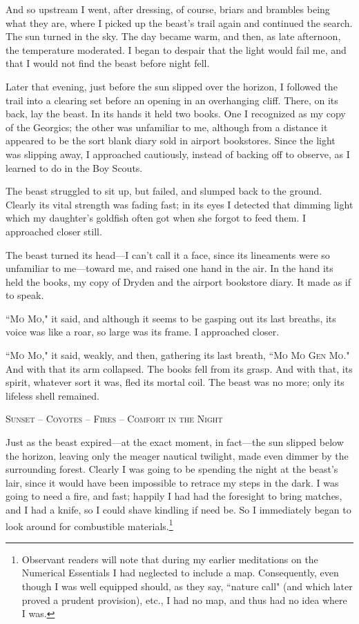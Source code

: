 \par
And so upstream I went, after dressing, of course, briars and brambles being what they are, where I picked up the beast's trail again and continued the search.  The sun turned in the sky.  The day became warm, and then, as late afternoon, the temperature moderated.  I began to despair that the light would fail me, and that I would not find the beast before night fell.
\par
Later that evening, just before the sun slipped over the horizon, I followed the trail into a clearing set before an opening in an overhanging cliff.  There, on its back, lay the beast.  In its hands it held two books.  One I recognized as my copy of the Georgics; the other was unfamiliar to me, although from a distance it appeared to be the sort blank diary sold in airport bookstores.  Since the light was slipping away, I approached cautiously, instead of backing off to observe, as I learned to do in the Boy Scouts.
\par
The beast struggled to sit up, but failed, and slumped back to the ground.  Clearly its vital strength was fading fast; in its eyes I detected that dimming light which my daughter's goldfish often got when she forgot to feed them.  I approached closer still.
\par
The beast turned its head—I can't call it a face, since its lineaments were so unfamiliar to me—toward me, and raised one hand in the air.  In the hand its held the books, my copy of Dryden and the airport bookstore diary.  It made as if to speak.
\par
``\textsc{Mo Mo}," it said, and although it seems to be gasping out its last breaths, its voice was like a roar, so large was its frame.  I approached closer.
\par
``\textsc{Mo Mo}," it said, weakly, and then, gathering its last breath, ``\textsc{Mo Mo Gen Mo}."  And with that its arm collapsed.  The books fell from its grasp.  And with that, its spirit, whatever sort it was, fled its mortal coil.  The beast was no more; only its lifeless shell remained.
\par
\begin{center}
\textsc{Sunset – Coyotes – Fires – Comfort in the Night}
\end{center}
\par
Just as the beast expired—at the exact moment, in fact—the sun slipped below the horizon, leaving only the meager nautical twilight, made even dimmer by the surrounding forest.  Clearly I was going to be spending the night at the beast's lair, since it would have been impossible to retrace my steps in the dark.  I was going to need a fire, and fast; happily I had had the foresight to bring matches, and I had a knife, so I could shave kindling if need be.  So I immediately began to look around for combustible materials.\footnote{Observant readers will note that during my earlier meditations on the Numerical Essentials I had neglected to include a map.  Consequently, even though I was well equipped should, as they say, ``nature call" (and which later proved a prudent provision), etc., I had no map, and thus had no idea where I was.}
